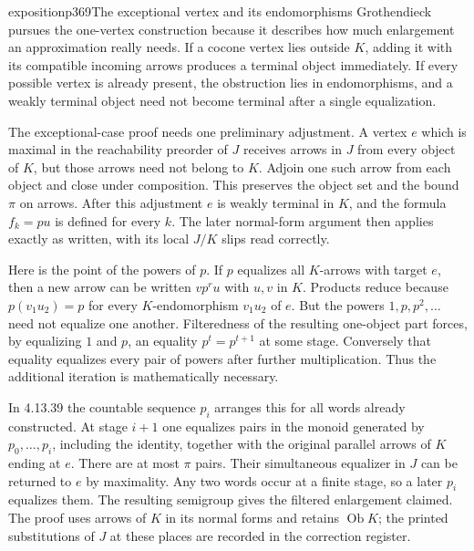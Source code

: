 \begin{dcomment}{exposition}{p369}{The exceptional vertex and its endomorphisms}
Grothendieck pursues the one-vertex construction because it describes how much enlargement an approximation really needs. If a cocone vertex lies outside $K$, adding it with its compatible incoming arrows produces a terminal object immediately. If every possible vertex is already present, the obstruction lies in endomorphisms, and a weakly terminal object need not become terminal after a single equalization.

The exceptional-case proof needs one preliminary adjustment. A vertex $e$ which is maximal in the reachability preorder of $J$ receives arrows in $J$ from every object of $K$, but those arrows need not belong to $K$. Adjoin one such arrow from each object and close under composition. This preserves the object set and the bound $\pi$ on arrows. After this adjustment $e$ is weakly terminal in $K$, and the formula $f_k=pu$ is defined for every $k$. The later normal-form argument then applies exactly as written, with its local $J/K$ slips read correctly.

Here is the point of the powers of $p$. If $p$ equalizes all $K$-arrows with target $e$, then a new arrow can be written $vp^ru$ with $u,v$ in $K$. Products reduce because $p(v_1u_2)=p$ for every $K$-endomorphism $v_1u_2$ of $e$. But the powers $1,p,p^2,\ldots$ need not equalize one another. Filteredness of the resulting one-object part forces, by equalizing $1$ and $p$, an equality $p^t=p^{t+1}$ at some stage. Conversely that equality equalizes every pair of powers after further multiplication. Thus the additional iteration is mathematically necessary.

In 4.13.39 the countable sequence $p_i$ arranges this for all words already constructed. At stage $i+1$ one equalizes pairs in the monoid generated by $p_0,\ldots,p_i$, including the identity, together with the original parallel arrows of $K$ ending at $e$. There are at most $\pi$ pairs. Their simultaneous equalizer in $J$ can be returned to $e$ by maximality. Any two words occur at a finite stage, so a later $p_i$ equalizes them. The resulting semigroup gives the filtered enlargement claimed. The proof uses arrows of $K$ in its normal forms and retains $\operatorname{Ob}K$; the printed substitutions of $J$ at these places are recorded in the correction register.
\end{dcomment}

